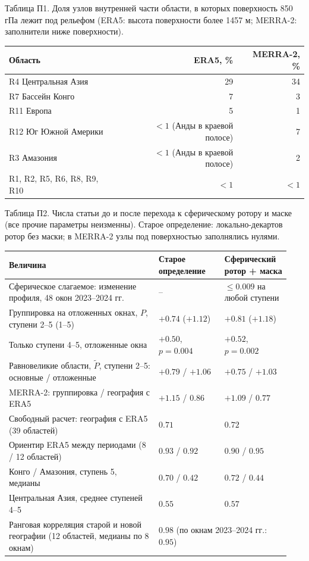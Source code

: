 \documentclass[12pt,a4paper]{article}
\begin{document}
\noindent Таблица П1. Доля узлов внутренней части области, в которых поверхность 850 гПа лежит под рельефом (ERA5: высота поверхности более 1457 м; MERRA-2: заполнители ниже поверхности).

\begin{singlespace}
\noindent\begin{tabular}{@{}lrr@{}}
\toprule
Область & ERA5, \% & MERRA-2, \%\\
\midrule
R4 Центральная Азия & 29 & 34\\
R7 Бассейн Конго & 7 & 3\\
R11 Европа & 5 & 1\\
R12 Юг Южной Америки & $<1$ (Анды в краевой полосе) & 7\\
R3 Амазония & $<1$ (Анды в краевой полосе) & 2\\
R1, R2, R5, R6, R8, R9, R10 & $<1$ & $<1$\\
\bottomrule
\end{tabular}
\end{singlespace}

\medskip
\noindent Таблица П2. Числа статьи до и после перехода к сферическому ротору и маске (все прочие параметры неизменны). Старое определение: локально-декартов ротор без маски; в MERRA-2 узлы под поверхностью заполнялись нулями.

\begin{singlespace}
\noindent\begin{tabular}{@{}p{0.5\linewidth}p{0.22\linewidth}p{0.22\linewidth}@{}}
\toprule
Величина & Старое определение & Сферический ротор + маска\\
\midrule
Сферическое слагаемое: изменение профиля, 48 окон 2023--2024 гг. & -- & $\le 0.009$ на любой ступени\\
Группировка на отложенных окнах, $P$, ступени 2--5 (1--5) & $+0.74$ ($+1.12$) & $+0.81$ ($+1.18$)\\
Только ступени 4--5, отложенные окна & $+0.50$, $p = 0.004$ & $+0.52$, $p = 0.002$\\
Равновеликие области, $\tilde P$, ступени 2--5: основные / отложенные & $+0.79$ / $+1.06$ & $+0.75$ / $+1.03$\\
MERRA-2: группировка / география с ERA5 & $+1.15$ / $0.86$ & $+1.09$ / $0.77$\\
Свободный расчет: география с ERA5 (39 областей) & $0.71$ & $0.72$\\
Ориентир ERA5 между периодами (8 / 12 областей) & $0.93$ / $0.92$ & $0.90$ / $0.95$\\
Конго / Амазония, ступень 5, медианы & $0.70$ / $0.42$ & $0.72$ / $0.44$\\
Центральная Азия, среднее ступеней 4--5 & $0.55$ & $0.57$\\
Ранговая корреляция старой и новой географии (12 областей, медианы по 8 окнам) & \multicolumn{2}{l}{$0.98$ (по окнам 2023--2024 гг.: $0.95$)}\\
\bottomrule
\end{tabular}
\end{singlespace}
\end{document}
